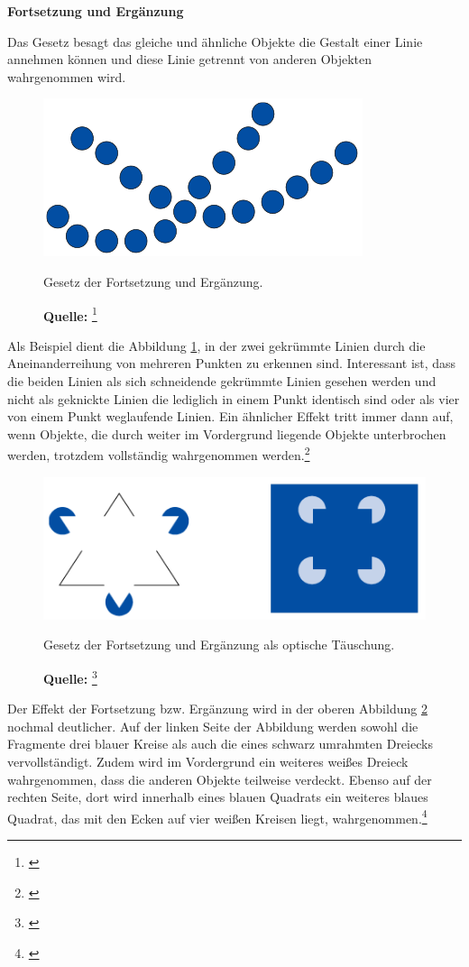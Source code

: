 \textbf{Fortsetzung und Ergänzung}

Das Gesetz besagt das gleiche und ähnliche Objekte die Gestalt einer Linie annehmen können und diese Linie getrennt von anderen Objekten wahrgenommen wird.
\begin{figure}[H]
  \centering
  \includegraphics[scale=1]{img/gesetz_der_Fortsetzung_und_Ergaenzung.PNG}
  \caption{Gesetz der Fortsetzung und Ergänzung.}
    \caption*{\textbf{Quelle:} \footnote{\cite{Dahm2006}}}
  \label{fig:fortsetzungUndErgaenzung1}
\end{figure}
Als Beispiel dient die Abbildung \ref{fig:fortsetzungUndErgaenzung1}, in der zwei gekrümmte Linien durch die Aneinanderreihung von mehreren Punkten zu erkennen sind. Interessant ist, dass die beiden Linien als sich schneidende gekrümmte Linien gesehen werden und nicht als geknickte Linien die lediglich in einem Punkt identisch sind oder als vier von einem Punkt weglaufende Linien. Ein ähnlicher Effekt tritt immer dann auf, wenn Objekte, die durch weiter im Vordergrund liegende Objekte unterbrochen werden, trotzdem vollständig wahrgenommen werden.\footnote{\cite[vgl.][61f]{Dahm2006}}
\begin{figure}[H]
  \centering
  \includegraphics[scale=1]{img/gesetz_der_Fortsetzung_und_Ergaenzung2.PNG}
  \caption{Gesetz der Fortsetzung und Ergänzung als optische Täuschung.}
    \caption*{\textbf{Quelle:} \footnote{\cite{Dahm2006}}}
  \label{fig:fortsetzungUndErgaenzung2}
\end{figure}
Der Effekt der Fortsetzung bzw. Ergänzung wird in der oberen Abbildung \ref{fig:fortsetzungUndErgaenzung2} nochmal deutlicher. Auf der linken Seite der Abbildung werden sowohl die Fragmente drei blauer Kreise als auch die eines schwarz umrahmten Dreiecks vervollständigt. Zudem wird im Vordergrund ein weiteres weißes Dreieck wahrgenommen, dass die anderen Objekte teilweise verdeckt. Ebenso auf der rechten Seite, dort wird innerhalb eines blauen Quadrats ein weiteres blaues Quadrat, das mit den Ecken auf vier weißen Kreisen liegt, wahrgenommen.\footnote{\cite[vgl.][61f]{Dahm2006}}

